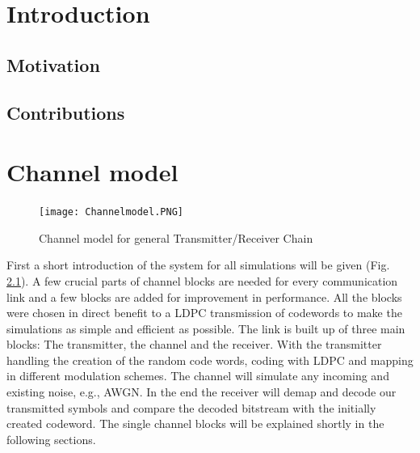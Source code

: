 \documentclass[12pt,oneside, reqno]{report}
\begin{document}


\tableofcontents

\newpage
\setlength{\baselineskip}{3ex}

\begin{spacing}{1.15}
\end{spacing}
\newpage
\thispagestyle{empty}
\null

\newpage
{}
\listoffigures

%

\newpage
\thispagestyle{empty}
\null
\newpage
\chapter{Introduction}
\section{Motivation}
\section{Contributions}

\newpage
\chapter{Channel model}
\label{sec:channel}
\begin{figure}[H]
	\centering
	\texttt{[image: Channelmodel.PNG]}
	\caption{Channel model for general Transmitter/Receiver Chain}
	\label{fig:Channelmodel}
\end{figure}
First a short introduction of the system for all simulations will be given (Fig. \ref{fig:Channelmodel}). A few crucial parts of channel blocks are needed for every communication link and a few blocks are added for improvement in performance. All the blocks were chosen in direct benefit to a LDPC transmission of codewords to make the simulations as simple and efficient as possible. 
The link is built up of three main blocks: The transmitter, the channel and the receiver. With the transmitter handling the creation of the random code words, coding with \gls{LDPC} and mapping in different modulation schemes. The channel will simulate any incoming and existing noise, e.g., \gls{AWGN}. In the end the receiver will demap and decode our transmitted symbols and compare the decoded bitstream with the initially created codeword.
\newline
The single channel blocks will be explained shortly in the following sections.
\end{document}
